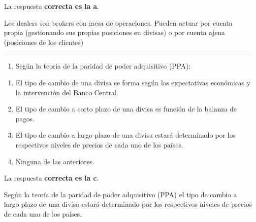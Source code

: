 \documentclass[
  letterpaper,
  DIV=11,
  numbers=noendperiod]{scrreprt}
\providecommand{\tightlist}{%
  \setlength{\itemsep}{0pt}\setlength{\parskip}{0pt}}\usepackage{longtable,booktabs,array}
\begin{document}
\begin{tcolorbox}[enhanced jigsaw, left=2mm, opacityback=0, colback=white, breakable, arc=.35mm, bottomrule=.15mm, rightrule=.15mm, toprule=.15mm, leftrule=.75mm, colframe=quarto-callout-tip-color-frame]
\begin{minipage}[t]{5.5mm}
\textcolor{quarto-callout-tip-color}{\faLightbulb}
\end{minipage}%
\begin{minipage}[t]{\textwidth - 5.5mm}

La respuesta \textbf{correcta es la a}.

Los dealers son brokers con mesa de operaciones. Pueden actuar por
cuenta propia (gestionando sus propias posiciones en divisas) o por
cuenta ajena (posiciones de los clientes)

\end{minipage}%
\end{tcolorbox}

\begin{center}\rule{0.5\linewidth}{0.5pt}\end{center}

\begin{enumerate}
\def\labelenumi{\arabic{enumi}.}
\setcounter{enumi}{40}
\tightlist
\item
  Según la teoría de la paridad de poder adquisitivo (PPA):
\end{enumerate}

\begin{enumerate}
\def\labelenumi{\alph{enumi}.}
\item
  El tipo de cambio de una divisa se forma según las expectativas
  económicas y la intervención del Banco Central.
\item
  El tipo de cambio a corto plazo de una divisa es función de la balanza
  de pagos.
\item
  El tipo de cambio a largo plazo de una divisa estará determinado por
  los respectivos niveles de precios de cada uno de los países.
\item
  Ninguna de las anteriores.
\end{enumerate}

\begin{tcolorbox}[enhanced jigsaw, left=2mm, opacityback=0, colback=white, breakable, arc=.35mm, bottomrule=.15mm, rightrule=.15mm, toprule=.15mm, leftrule=.75mm, colframe=quarto-callout-tip-color-frame]
\begin{minipage}[t]{5.5mm}
\textcolor{quarto-callout-tip-color}{\faLightbulb}
\end{minipage}%
\begin{minipage}[t]{\textwidth - 5.5mm}

La respuesta \textbf{correcta es la c}.

Según la teoría de la paridad de poder adquisitivo (PPA) el tipo de
cambio a largo plazo de una divisa estará determinado por los
respectivos niveles de precios de cada uno de los países.

\end{minipage}%
\end{tcolorbox}
\end{document}
